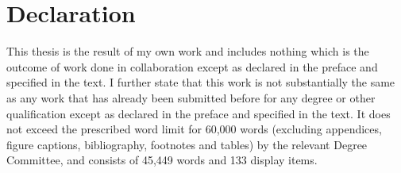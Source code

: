 \chapter{Declaration}
This thesis is the result of my own work and includes nothing which is the outcome of work done in collaboration except as declared in the preface and specified in the text. I further state that this work is not substantially the same as any work that has already been submitted before for any degree or other qualification except as declared in the preface and specified in the text. It does not exceed the prescribed word limit for 60,000 words (excluding appendices, figure captions, bibliography, footnotes and tables) by the relevant Degree Committee, and consists of 45,449 words and 133 display items.



